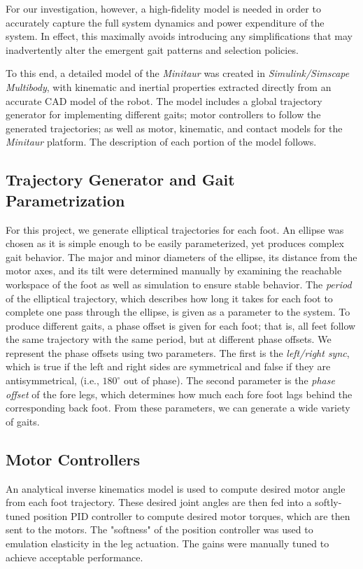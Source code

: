\documentclass[conference,11pt,letterpaper]{IEEEtran}
\begin{document}

For our investigation, however, a high-fidelity model is needed in order to accurately capture the full system dynamics and power expenditure of the system. In effect, this maximally avoids introducing any simplifications that may inadvertently alter the emergent gait patterns and selection policies.

To this end, a detailed model of the \emph{Minitaur} was created in \emph{Simulink/Simscape Multibody}, with kinematic and inertial properties extracted directly from an accurate CAD model of the robot. The model includes a global trajectory generator for implementing different gaits; motor controllers to follow the generated trajectories; as well as motor, kinematic, and contact models for the \emph{Minitaur} platform. The description of each portion of the model follows.


\subsection{Trajectory Generator and Gait Parametrization}
For this project, we generate elliptical trajectories for each foot. An ellipse was chosen as it is simple enough to be easily parameterized, yet produces complex gait behavior. The major and minor diameters of the ellipse, its distance from the motor axes, and its tilt were determined manually by examining the reachable workspace of the foot as well as simulation to ensure stable behavior. The \emph{period} of the elliptical trajectory, which describes how long it takes for each foot to complete one pass through the ellipse, is given as a parameter to the system. To produce different gaits, a phase offset is given for each foot; that is, all feet follow the same trajectory with the same period, but at different phase offsets.  We represent the phase offsets using two parameters. The first is the \emph{left/right sync}, which is true if the left and right sides are symmetrical and false if they are antisymmetrical, (i.e., $180^\circ$ out of phase). The second parameter is the \emph{phase offset} of the fore legs, which determines how much each fore foot lags behind the corresponding back foot. From these parameters, we can generate a wide variety of gaits.


\subsection{Motor Controllers}
An analytical inverse kinematics model is used to compute desired motor angle from each foot trajectory. These desired joint angles are then fed into a softly-tuned position PID controller to compute desired motor torques, which are then sent to the motors. The "softness" of the position controller was used to emulation elasticity in the leg actuation. The gains were manually tuned to achieve acceptable performance. 
\end{document}
